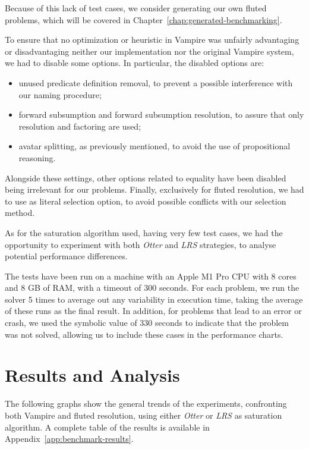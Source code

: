 Because of this lack of test cases, we consider generating our own fluted problems, which will be covered in Chapter~\ref{chap:generated-benchmarking}.

To ensure that no optimization or heuristic in Vampire was unfairly advantaging or disadvantaging neither our implementation nor the original Vampire system, we had to disable some options.
In particular, the disabled options are:
\begin{itemize}
  \item unused predicate definition removal, to prevent a possible interference with our naming procedure;
  \item forward subsumption and forward subsumption resolution, to assure that only resolution and factoring are used;
  \item avatar splitting, as previously mentioned, to avoid the use of propositional reasoning.
\end{itemize}

Alongside these settings, other options related to equality have been disabled being irrelevant for our problems.
Finally, exclusively for fluted resolution, we had to use  as literal selection option, to avoid possible conflicts with our selection method.

As for the saturation algorithm used, having very few test cases, we had the opportunity to experiment with both \emph{Otter} and \emph{LRS} strategies, to analyse potential performance differences.

The tests have been run on a machine with an Apple M1 Pro CPU with 8 cores and 8 GB of RAM, with a timeout of \(300\) seconds.
For each problem, we run the solver 5 times to average out any variability in execution time, taking the average of these runs as the final result.
In addition, for problems that lead to an error or crash, we used the symbolic value of \(330\) seconds to indicate that the problem was not solved, allowing us to include these cases in the performance charts.

\section{Results and Analysis}\label{sec:tptp-results-analysis}

The following graphs show the general trends of the experiments, confronting both Vampire and fluted resolution, using either \emph{Otter} or \emph{LRS} as saturation algorithm.
A complete table of the results is available in Appendix~\ref{app:benchmark-results}.

